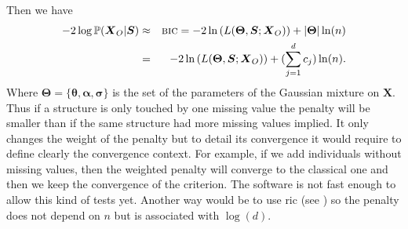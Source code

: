 \documentclass[12pt,a4paper]{report}
\begin{document}
 Then we have
			\begin{eqnarray}
		-2\log \mathbb{P}(\boldsymbol{X}_O|\boldsymbol{S})&\approx & \mbox{{\sc bic}}=-2\ln\left(L(\boldsymbol{\Theta},\boldsymbol{S};\boldsymbol{X}_O)\right)+|\boldsymbol{\Theta}|\ln(n) \nonumber  \\
		&=& -2\ln\left(L(\boldsymbol{\Theta},\boldsymbol{S};\boldsymbol{X}_O)\right)+(\sum_{j=1}^dc_j)\ln(n). \nonumber 
	\end{eqnarray}
			 Where $\boldsymbol{\Theta}=\{\boldsymbol{\theta},\boldsymbol{\alpha},\boldsymbol{\sigma}\}$ is the set of the parameters of the Gaussian mixture on $\boldsymbol{X}$. Thus if a structure is only touched by one missing value the penalty will be smaller than if the same structure had more missing values implied. It only changes the weight of the penalty but to detail its convergence it would require to define clearly the convergence context. For example, if we add individuals without missing values, then the weighted penalty will converge to the classical one and then we keep the convergence of the criterion. %
			 The software is not fast enough to allow this kind of tests yet.
			Another way would be to use {\sc ric} (see \cite{foster1994risk}) so the penalty does not depend on $n$ but is associated with $\log(d)$. %
		
%	
			
%	

\end{document}
